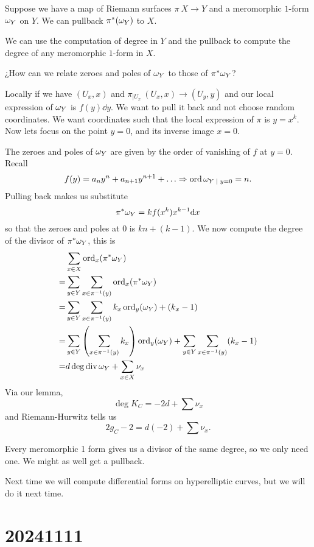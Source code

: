 \documentclass[12pt]{memoir}
\begin{document}
\begin{ptcbp}
    Suppose we have a map of Riemann surfaces $\pi\:X\to Y$ and a meromorphic $1$-form $\omega_Y$ on $Y$. We can pullback $\pi^\ast(\omega_Y)$ to $X$.\par
    We can use the computation of degree in $Y$ and the pullback to compute the degree of any meromorphic $1$-form in $X$.
    \begin{center}
        ¿How can we relate zeroes and poles of $\omega_Y$ to those of $\pi^\ast\omega_Y$?
    \end{center}
    Locally if we have $(U_x,x)$ and $\pi_{\mid U_x}\: (U_x,x)\to(U_y,y)$ and our local expression of $\omega_Y$ is $f(y)\dd y$. We want to pull it back and not choose random coordinates. We want coordinates such that the local expression of $\pi$ is $y=x^k$. Now lets focus on the point $y=0$, and its inverse image $x=0$.\par
    The zeroes and poles of $\omega_Y$ are given by the order of vanishing of $f$ at $y=0$. Recall 
    $$f(y)=a_ny^n+a_{n+1}y^{n+1}+\dots\To\ord\om_{Y\mid y=0}=n.$$
    Pulling back makes us substitute 
    $$\pi^\ast\omega_Y=kf(x^k)x^{k-1}\dd x$$
    so that the zeroes and poles at $0$ is $kn+(k-1)$. We now compute the degree of the divisor of $\pi^\ast\omega_Y$, this is 
    \begin{align*}
    &\sum_{x\in X}\operatorname{ord}_x(\pi^\ast\omega_Y)\\
    =&\sum_{y\in Y}\sum_{x\in \pi^{-1}(y)}\operatorname{ord}_x(\pi^\ast\omega_Y)\\
=&\sum_{y\in Y}\sum_{x\in\pi^{-1}(y)}k_x\operatorname{ord}_y(\omega_Y)+(k_x-1)\\
=&\sum_{y\in Y}\left(\sum_{x\in\pi^{-1}(y)}k_x\right)\operatorname{ord}_y(\omega_Y)+\sum_{y\in Y}\sum_{x\in\pi^{-1}(y)}(k_x-1)\\
=&d\deg\operatorname{div}\omega_Y+\sum_{x\in X}\nu_x
    \end{align*}
    Via our lemma, 
    $$\deg K_C=-2d+\sum\nu_x$$
    and Riemann-Hurwitz tells us 
    $$2g_C-2=d(-2)+\sum\nu_x.$$
\end{ptcbp}

Every meromorphic 1 form gives us a divisor of the same degree, so we only need one. We might as well get a pullback.\par
Next time we will compute differential forms on hyperelliptic curves, but we will do it next time.

\section{20241111}
\end{document}
